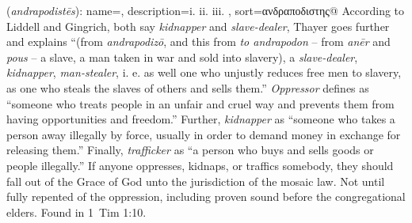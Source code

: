 \item[Oppressor,]

(\textit{andrapodistēs}):
{
    name=,
    description={i.  ii.  iii. },
    sort=ανδραποδιστης@
}
According to Liddell and Gingrich, both say \emph{kidnapper} and \emph{slave-dealer}, Thayer goes further and explains ``(from \emph{andrapodizō}, and this from \emph{to andrapodon} -- from \emph{anēr} and \emph{pous} -- a slave, a man taken in war and sold into slavery), a \emph{slave-dealer}, \emph{kidnapper}, \emph{man-stealer}, i. e. as well one who unjustly reduces free men to slavery, as one who steals the slaves of others and sells them.'' 
\emph{Oppressor} defines as ``someone who treats people in an unfair and cruel way and prevents them from having opportunities and freedom.'' 
Further, \emph{kidnapper} as ``someone who takes a person away illegally by force, usually in order to demand money in exchange for releasing them.'' 
Finally, \emph{trafficker} as ``a person who buys and sells goods or people illegally.'' If anyone oppresses, kidnaps, or traffics somebody, they should fall out of the Grace of God unto the jurisdiction of the mosaic law. Not until fully repented of the oppression, including proven sound before the congregational elders.
Found in 1~Tim 1:10.
